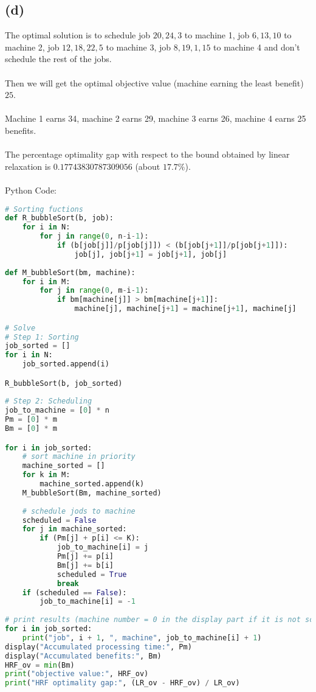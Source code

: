 \documentclass{article}
\begin{document}
\subsection{(d)}

The optimal solution is to schedule job $20, 24, 3$ to machine 1, job $6, 13, 10$ to machine 2, job $12, 18, 22, 5$ to machine 3, job $8, 19, 1, 15$ to machine 4 and don't schedule the rest of the jobs.
\\
\\Then we will get the optimal objective value (machine earning the least benefit) $25$.
\\
\\Machine 1 earns 34, machine 2 earns 29, machine 3 earns 26, machine 4 earns 25 benefits.
\\
\\The percentage optimality gap with respect to the bound obtained by linear relaxation is $0.17743830787309056$ (about $17.7\%$).
\\
\\Python Code:
\begin{lstlisting}[breaklines = true, language=Python]
# Sorting fuctions
def R_bubbleSort(b, job):
    for i in N:
        for j in range(0, n-i-1):
            if (b[job[j]]/p[job[j]]) < (b[job[j+1]]/p[job[j+1]]):
                job[j], job[j+1] = job[j+1], job[j]
                
def M_bubbleSort(bm, machine):
    for i in M:
        for j in range(0, m-i-1):
            if bm[machine[j]] > bm[machine[j+1]]:
                machine[j], machine[j+1] = machine[j+1], machine[j]

# Solve
# Step 1: Sorting
job_sorted = []
for i in N:
    job_sorted.append(i)

R_bubbleSort(b, job_sorted)
    
# Step 2: Scheduling
job_to_machine = [0] * n
Pm = [0] * m
Bm = [0] * m

for i in job_sorted:
    # sort machine in priority
    machine_sorted = []
    for k in M:
        machine_sorted.append(k)
    M_bubbleSort(Bm, machine_sorted)
    
    # schedule jods to machine
    scheduled = False
    for j in machine_sorted:
        if (Pm[j] + p[i] <= K):
            job_to_machine[i] = j
            Pm[j] += p[i]
            Bm[j] += b[i]
            scheduled = True
            break         
    if (scheduled == False):
        job_to_machine[i] = -1
        
# print results (machine number = 0 in the display part if it is not scheduled)
for i in job_sorted:
    print("job", i + 1, ", machine", job_to_machine[i] + 1)
display("Accumulated processing time:", Pm)
display("Accumulated benefits:", Bm)
HRF_ov = min(Bm)
print("objective value:", HRF_ov)
print("HRF optimality gap:", (LR_ov - HRF_ov) / LR_ov)
\end{lstlisting}
\end{document}
